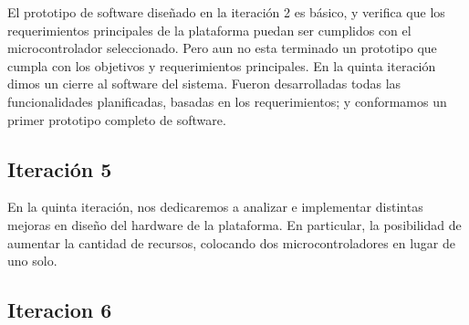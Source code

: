 El prototipo de software diseñado en la iteración 2 es básico, y verifica que los requerimientos principales de la plataforma puedan ser cumplidos con el microcontrolador seleccionado. Pero aun no esta terminado un prototipo que cumpla con los objetivos y requerimientos principales. En la quinta iteración dimos un cierre al software del sistema. Fueron desarrolladas todas las funcionalidades planificadas, basadas en los requerimientos; y conformamos un primer prototipo completo de software.


\subsection{Iteración 5} %
\label{sub:iteracion_5}

En la quinta iteración, nos dedicaremos a analizar e implementar distintas mejoras en diseño del hardware de la plataforma. En particular, la posibilidad de aumentar la cantidad de recursos, colocando dos microcontroladores en lugar de uno solo.


\subsection{Iteracion 6} %
\label{sub:iteracion_6}

